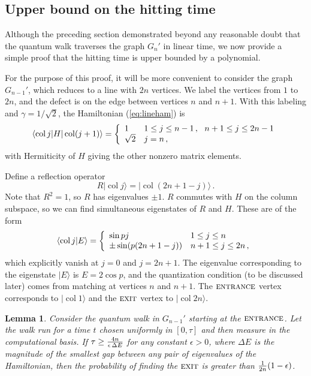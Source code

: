 \documentclass[aps,11pt,twoside,nofootinbib,tightenlines,superscriptaddress,preprintnumbers]{revtex4}
\makeatletter
\newcommand{\<}{\langle}
\renewcommand{\>}{\rangle}
\newcommand{\be}{\begin{equation}}
\newcommand{\ee}{\end{equation}}
\newcommand{\cond}[1]{\left\{\begin{array}{l@{~~~}l}#1\end{array}\right.}
\newcommand{\ent}{{\textsc{entrance}}}
\newcommand{\exit}{{\textsc{exit}}}
\newcommand{\col}{\mathop{\mathrm{col}}\nolimits}
\newtheorem{lemma}[theorem]{Lemma}
\makeatother
\begin{document}
\subsection{Upper bound on the hitting time}\label{subsec:hitting}

Although the preceding section demonstrated beyond any reasonable doubt
that the quantum walk traverses the graph $G_n'$ in linear time, we now
provide a simple proof that the hitting time is upper bounded by a
polynomial.

For the purpose of this proof, it will be more convenient to consider the
graph $G_{n-1}'$, which reduces to a line with $2n$ vertices.  We label
the vertices from $1$ to $2n$, and the defect is on the edge between
vertices $n$ and $n+1$.  With this labeling and $\gamma=1/\sqrt2$, the
Hamiltonian (\ref{eq:lineham}) is
\be
  \<\col j|H|\col(j+1)\> = \cond{
   1      & 1 \le j \le n-1 \,,~~ n+1 \le j \le 2n-1 \\
   \sqrt2 & j=n \,,}
\ee
with Hermiticity of $H$ giving the other nonzero matrix elements.

Define a reflection operator
\be
  R|\col j\> = |\col(2n+1-j)\>
\,.
\ee
Note that $R^2=1$, so $R$ has eigenvalues $\pm 1$.  $R$ commutes with $H$
on the column subspace, so we can find simultaneous eigenstates of $R$ and
$H$.  These are of the form
\be
  \<\col j|E\> = \cond{
    \sin p j          & 1 \le j \le n \\
    \pm\sin(p(2n+1-j)) & n+1 \le j \le 2n \,, }
\label{eq:eigenstates}
\ee
which explicitly vanish at $j=0$ and $j=2n+1$.  The eigenvalue
corresponding to the eigenstate $|E\>$ is $E=2 \cos p$, and the
quantization condition (to be discussed later) comes from matching at
vertices $n$ and $n+1$.  The $\ent$ vertex corresponds to $|\col 1\>$ and
the $\exit$ vertex to $|\col 2n\>$.

\begin{lemma}\label{lemma:hitting}
Consider the quantum walk in $G_{n-1}'$ starting at the $\ent$.  Let the
walk run for a time $t$ chosen uniformly in $[0,\tau]$ and then measure in
the computational basis.  If $\tau \ge {4n \over \epsilon \, \Delta E}$
for any constant $\epsilon>0$, where $\Delta E$ is the magnitude of the
smallest gap between any pair of eigenvalues of the Hamiltonian, then the
probability of finding the $\exit$ is greater than ${1 \over
2n}(1-\epsilon)$.
\end{lemma}
\end{document}
